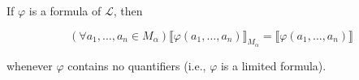 If $\varphi$ is a formula of $\mathcal{L}$, then

$$
(\forall a_1, \ldots, a_n \in M_{\alpha}) \llbracket \varphi(a_1, \ldots, a_n) \rrbracket_{M_{\alpha}} = \llbracket \varphi(a_1, \ldots, a_n) \rrbracket
$$

whenever $\varphi$ contains no quantifiers (i.e., $\varphi$ is a limited formula).
